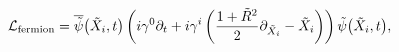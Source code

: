 \begin{equation}
\label{L2}
{\cal L}_{{\rm fermion}} = {\overline {\tilde \psi}} \big({\tilde X}_i,t \big) 
\left( i \gamma^0 \partial_t + 
i \gamma^i \left(\frac{1+{\tilde R}^2}{2} \partial_{{\tilde X}_i} - 
{\tilde X}_i \right)
\right)
{\tilde \psi} \big({\tilde X}_i,t \big),
\end{equation}


